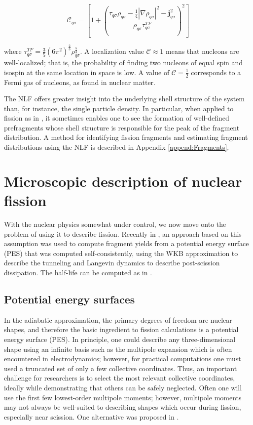 \begin{equation}
\mathcal{C}_{q\sigma} = \left[1+\left(\frac{\tau_{q\sigma}\rho_{q\sigma}-\frac{1}{4}|\nabla\rho_{q\sigma}|^2-\mathbf{j}^2_{q\sigma}}{\rho_{q\sigma}\tau_{q\sigma}^{TF}}\right)^2\right]
\end{equation}

\noindent where $\tau_{q\sigma}^{TF}=\frac{3}{5}(6\pi^2)^\frac{2}{3}\rho_{q\sigma}^\frac{5}{3}$. A localization value $\mathcal{C} \approx 1$ means that nucleons are well-localized; that is, the probability of finding two nucleons of equal spin and isospin at the same location in space is low. A value of $\mathcal{C}=\frac{1}{2}$ corresponds to a Fermi gas of nucleons, as found in nuclear matter.

The NLF offers greater insight into the underlying shell structure of the system than, for instance, the single particle density. In particular, when applied to fission as in \cite{Sadhukhan2017}, it sometimes enables one to see the formation of well-defined prefragments whose shell structure is responsible for the peak of the fragment distribution. A method for identifying fission fragments and estimating fragment distributions using the NLF is described in Appendix \ref{append:Fragments}.

\section{Microscopic description of nuclear fission}
With the nuclear physics somewhat under control, we now move onto the problem of using it to describe fission. Recently in \cite{Sadhukhan2016}, an approach based on this assumption was used to compute fragment yields from a potential energy surface (PES) that was computed self-consistently, using the WKB approximation to describe the tunneling and Langevin dynamics to describe post-scission dissipation. The half-life can be computed as in \cite{Sadhukhan2013}.

\subsection{Potential energy surfaces}
In the adiabatic approximation, the primary degrees of freedom are nuclear shapes, and therefore the basic ingredient to fission calculations is a potential energy surface (PES). In principle, one could describe any three-dimensional shape using an infinite basis such as the multipole expansion which is often encountered in electrodynamics; however, for practical computations one must used a truncated set of only a few collective coordinates. Thus, an important challenge for researchers is to select the most relevant collective coordinates, ideally while demonstrating that others can be safely neglected. Often one will use the first few lowest-order multipole moments; however, multipole moments may not always be well-suited to describing shapes which occur during fission, especially near scission. One alternative was proposed in \cite{Younes2012}.

